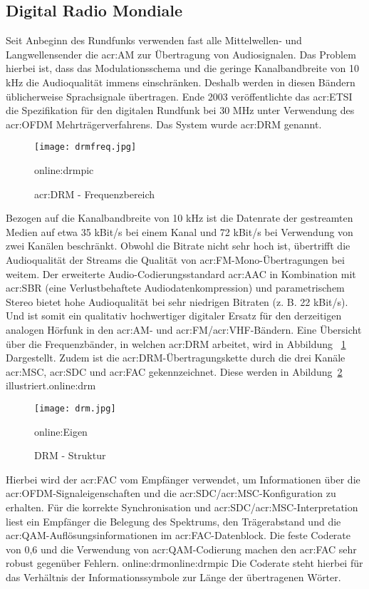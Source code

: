 \subsection{Digital Radio Mondiale}
\label{subsec:drm}
Seit Anbeginn des Rundfunks verwenden fast alle Mittelwellen- und Langwellensender die \gls{acr:AM} zur Übertragung von Audiosignalen. Das Problem hierbei ist, dass das Modulationsschema und die geringe Kanalbandbreite von 10 kHz die Audioqualität immens einschränken. Deshalb werden in diesen Bändern üblicherweise Sprachsignale übertragen. Ende 2003 veröffentlichte das \gls{acr:ETSI} die Spezifikation für den digitalen Rundfunk bei 30 MHz unter Verwendung des \gls{acr:OFDM} Mehrträgerverfahrens. Das System wurde \gls{acr:DRM} genannt. 

\begin{figure}[H]
	\centering
	\texttt{[image: drmfreq.jpg]}
	\caption[\gls{acr:DRM} - Frequenzbereich]{\gls{acr:DRM} - Frequenzbereich} 
	\gls{online:drmpic}
	\label{fig:drmfreq}
\end{figure}

Bezogen auf die Kanalbandbreite von 10 kHz ist die Datenrate der gestreamten Medien auf etwa 35 kBit/s bei einem Kanal und 72 kBit/s bei Verwendung von zwei Kanälen beschränkt. Obwohl die Bitrate nicht sehr hoch ist, übertrifft die Audioqualität der Streams die Qualität von \gls{acr:FM}-Mono-Übertragungen bei weitem. Der erweiterte Audio-Codierungsstandard \gls{acr:AAC} in Kombination mit \gls{acr:SBR} (eine Verlustbehaftete Audiodatenkompression) und parametrischem Stereo bietet hohe Audioqualität bei sehr niedrigen Bitraten (z. B. 22 kBit/s). Und ist somit ein qualitativ hochwertiger digitaler Ersatz für den derzeitigen analogen Hörfunk in den \gls{acr:AM}- und \gls{acr:FM}/\gls{acr:VHF}-Bändern. Eine Übersicht über die Frequenzbänder, in welchen \gls{acr:DRM} arbeitet, wird in Abbildung ~\ref{fig:drmfreq} Dargestellt. Zudem ist die \gls{acr:DRM}-Übertragungskette durch die drei Kanäle \gls{acr:MSC}, \gls{acr:SDC} und \gls{acr:FAC} gekennzeichnet. Diese werden in Abildung~\ref{fig:drm} illustriert.\gls{online:drm}



\begin{figure}[H]
	\centering
	\texttt{[image: drm.jpg]}
	\caption[DRM - Struktur]{DRM - Struktur} 
	\gls{online:Eigen}
	\label{fig:drm}
\end{figure}
Hierbei wird der \gls{acr:FAC} vom Empfänger verwendet, um Informationen über die \gls{acr:OFDM}-Signaleigenschaften und die \gls{acr:SDC}/\gls{acr:MSC}-Konfiguration zu erhalten. Für die korrekte Synchronisation und \gls{acr:SDC}/\gls{acr:MSC}-Interpretation liest ein Empfänger die Belegung des Spektrums, den Trägerabstand und die \gls{acr:QAM}-Auflösungsinformationen im \gls{acr:FAC}-Datenblock. Die feste Coderate von 0,6 und die Verwendung von \gls{acr:QAM}-Codierung machen den \gls{acr:FAC} sehr robust gegenüber Fehlern. \gls{online:drm}\gls{online:drmpic} Die Coderate steht hierbei für das Verhältnis der Informationssymbole zur Länge der übertragenen Wörter.

